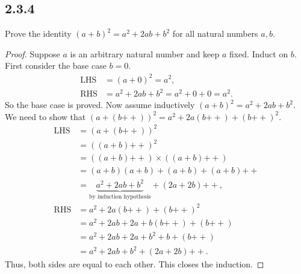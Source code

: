 \documentclass[12pt, letter]{article}
\begin{document}
\subsection*{2.3.4}
Prove the identity $(a+b)^2=a^2+2ab+b^2$ for all natural numbers $a,b$.
\begin{proof}
    Suppose $a$ is an arbitrary natural number and keep $a$ fixed. Induct on $b$. First consider the base case $b=0$. 
    \begin{equation*}
        \begin{aligned}
            \text{LHS}&=(a+0)^2=a^2,\\
            \text{RHS}&=a^2+2ab+b^2=a^2+0+0=a^2.
        \end{aligned}
    \end{equation*}
    So the base case is proved. Now assume inductively $(a+b)^2=a^2+2ab+b^2$. We need to show that $(a+(b\mathtt{++}))^2=a^2+2a(b\mathtt{++})+(b\mathtt{++})^2$.
    \begin{equation*}
        \begin{aligned}
            \text{LHS}&=(a+(b\mathtt{++}))^2\\&=((a+b)\mathtt{++})^2\\
            &=((a+b)\mathtt{++})\times((a+b)\mathtt{++})\\
            &=(a+b)(a+b)+(a+b)+(a+b)\mathtt{++}\\
            &=\underbrace{a^2+2ab+b^2}_{\text{by induction hypothesis}}+(2a+2b)\mathtt{++},\\
            \text{RHS}&=a^2+2a(b\mathtt{++})+(b\mathtt{++})^2\\
            &=a^2+2ab+2a+b(b\mathtt{++})+(b\mathtt{++})\\
            &=a^2+2ab+2a+b^2+b+(b\mathtt{++})\\
            &=a^2+2ab+b^2+(2a+2b)\mathtt{++}.
        \end{aligned}
    \end{equation*}
    Thus, both sides are equal to each other. This closes the induction.
\end{proof}
\end{document}
